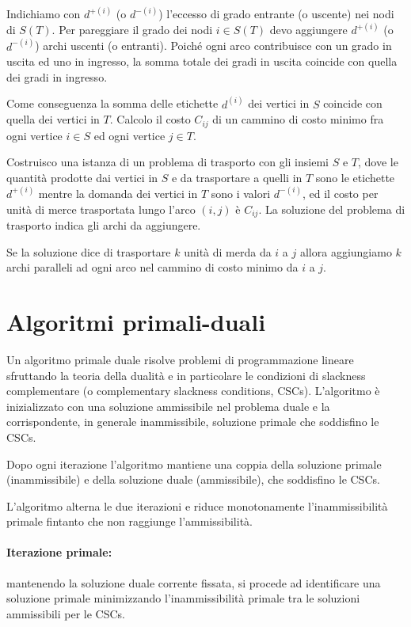 \documentclass[\main/main.tex]{subfiles}
\begin{document}
Indichiamo con \(d^{+(i)}\) (o \(d^{-(i)}\)) l'eccesso di grado entrante (o uscente) nei nodi di \(S(T)\). Per pareggiare il grado dei nodi \(i \in S(T)\) devo aggiungere \(d^{+(i)}\) (o \(d^{-(i)}\)) archi uscenti (o entranti). Poiché ogni arco contribuisce con un grado in uscita ed uno in ingresso, la somma totale dei gradi in uscita coincide con quella dei gradi in ingresso.

Come conseguenza la somma delle etichette \(d^{(i)}\) dei vertici in \(S\) coincide con quella dei vertici in \(T\). Calcolo il costo \(C_{ij}\) di un cammino di costo minimo fra ogni vertice \(i \in S\) ed ogni vertice \(j \in T\).

Costruisco una istanza di un problema di trasporto con gli insiemi \(S\) e \(T\), dove le quantità prodotte dai vertici in \(S\) e da trasportare a quelli in \(T\) sono le etichette \(d^{+(i)}\) mentre la domanda dei vertici in \(T\) sono i valori \(d^{-(i)}\), ed il costo per unità di merce trasportata lungo l'arco \((i,j)\) è \(C_{ij}\). La soluzione del problema di trasporto indica gli archi da aggiungere.

Se la soluzione dice di trasportare \(k\) unità di merda da \(i\) a \(j\) allora aggiungiamo \(k\) archi paralleli ad ogni arco nel cammino di costo minimo da \(i\) a \(j\).
\clearpage
\section{Algoritmi primali-duali}
Un algoritmo primale duale risolve problemi di programmazione lineare sfruttando la teoria della dualità e in particolare le condizioni di slackness complementare (o complementary slackness conditions, CSCs). L'algoritmo è inizializzato con una soluzione ammissibile nel problema duale e la corrispondente, in generale inammissibile, soluzione primale che soddisfino le CSCs.

Dopo ogni iterazione l'algoritmo mantiene una coppia della soluzione primale (inammissibile) e della soluzione duale (ammissibile), che soddisfino le CSCs.

L'algoritmo alterna le due iterazioni e riduce monotonamente l'inammissibilità primale fintanto che non raggiunge l'ammissibilità.

\paragraph*{Iterazione primale:} mantenendo la soluzione duale corrente fissata, si procede ad identificare una soluzione primale minimizzando l'inammissibilità primale tra le soluzioni ammissibili per le CSCs.
\end{document}
